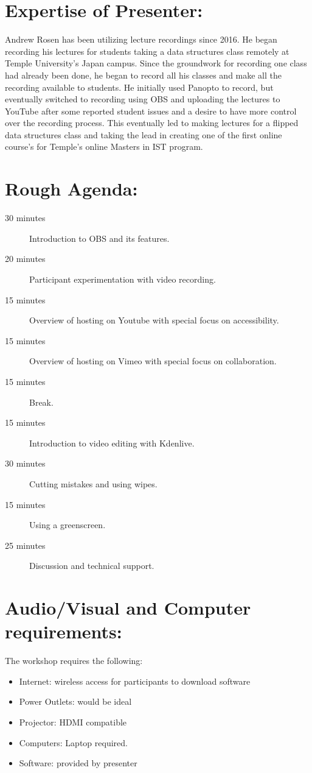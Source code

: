 \documentclass[10pt,letterpaper]{article}
\begin{document}
\section*{Expertise of Presenter:}
Andrew Rosen has been utilizing lecture recordings since 2016.  
He began recording his lectures for students taking a data structures class remotely at Temple University's Japan campus.
Since the groundwork for recording one class had already been done, he began to record all his classes and make all the recording available to students.
He initially used Panopto to record, but eventually switched to recording using OBS and uploading the lectures to YouTube after some reported student issues and a desire to have more control over the recording process.
This eventually led to making lectures for a flipped data structures class and taking the lead in creating one of the first online course's for Temple's online Masters in IST program. 
\section*{Rough Agenda: }
\begin{description}
	\item[30 minutes] Introduction to OBS and its features.
	\item[20 minutes] Participant experimentation with video recording.
	\item[15 minutes] Overview of hosting on Youtube with special focus on accessibility.
	\item[15 minutes] Overview of hosting on Vimeo with special focus on collaboration.
	\item[15 minutes] Break.
	\item[15 minutes] Introduction to video editing with Kdenlive.
	\item[30 minutes] Cutting mistakes and using wipes.
	\item[15 minutes] Using a greenscreen.
	\item[25 minutes] Discussion and technical support.
\end{description}
\section*{Audio/Visual and Computer requirements:  }

The workshop requires the following:
\begin{itemize}
	\item Internet: wireless access for participants to download software
	\item Power Outlets: would be ideal
	\item Projector: HDMI compatible
	\item Computers: Laptop required. 
	\item Software: provided by presenter
\end{itemize}
\end{document}
